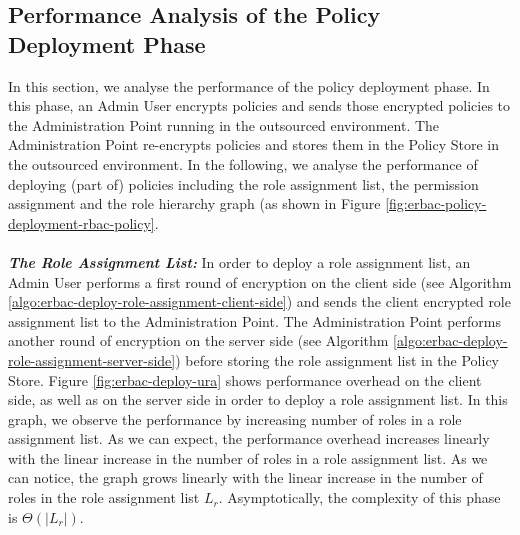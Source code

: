 \documentclass[epsfig,a4paper,11pt,titlepage]{book}
\numberwithin{algorithm}{chapter}
\begin{document}
\subsection{Performance Analysis of the Policy Deployment Phase}
In this section, we analyse the performance of the policy deployment phase. In this phase, an Admin User encrypts policies and sends those encrypted policies to the Administration Point running in the outsourced environment. The Administration Point re-encrypts policies and stores them in the Policy Store in the outsourced environment. In the following, we analyse the performance of deploying (part of) policies including the role assignment list, the permission assignment and the role hierarchy graph (as shown in Figure \ref{fig:erbac-policy-deployment-rbac-policy}. \\ \\
\noindent \emph{\textbf{The Role Assignment List:}} 
In order to deploy a role assignment list, an Admin User performs a first round of encryption on the client side (see Algorithm \ref{algo:erbac-deploy-role-assignment-client-side}) and sends the client encrypted role assignment list to the Administration Point. The Administration Point performs another round of encryption on the server side (see Algorithm \ref{algo:erbac-deploy-role-assignment-server-side}) before storing the role assignment list in the Policy Store. Figure \ref{fig:erbac-deploy-ura} shows performance overhead on the client side, as well as on the server side in order to deploy a role assignment list. In this graph, we observe the performance by increasing number of roles in a role assignment list. As we can expect, the performance overhead increases linearly with the linear increase in the number of roles in a role assignment list. As we can notice, the graph grows linearly with the linear increase in the number of roles in the role assignment list $L_r$. Asymptotically, the complexity of this phase is ${\Theta}(| L_r |)$.
\end{document}

